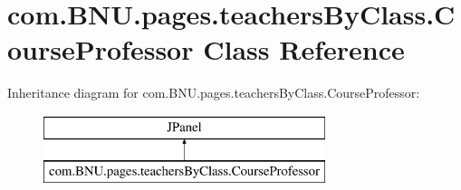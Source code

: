 \hypertarget{classcom_1_1_b_n_u_1_1pages_1_1teachers_by_class_1_1_course_professor}{}\section{com.\+B\+N\+U.\+pages.\+teachers\+By\+Class.\+Course\+Professor Class Reference}
\label{classcom_1_1_b_n_u_1_1pages_1_1teachers_by_class_1_1_course_professor}
Inheritance diagram for com.\+B\+N\+U.\+pages.\+teachers\+By\+Class.\+Course\+Professor\+:\begin{figure}[H]
\begin{center}
\leavevmode
\includegraphics[height=2.000000cm]{classcom_1_1_b_n_u_1_1pages_1_1teachers_by_class_1_1_course_professor}
\end{center}
\end{figure}
